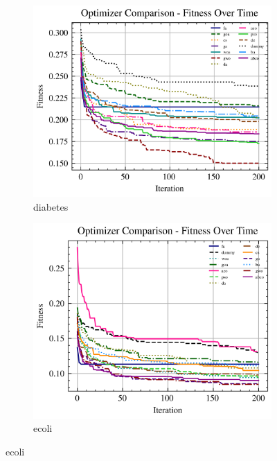 \begin{figure}[htp]
    \begin{subfigure}[b]{0.45\textwidth}
        \includegraphics[width=\textwidth]{imagenes/fitness_charts/img/binary/diabetes/optimizers_fitness_knn.png}
        \caption{diabetes}
        \label{fig:convergencia_diabetes_knn}
    \end{subfigure}
    \begin{subfigure}[b]{0.45\textwidth}
        \includegraphics[width=\textwidth]{imagenes/fitness_charts/img/binary/ecoli/optimizers_fitness_knn.png}
        \caption{ecoli}
        \label{fig:convergencia_ecoli_knn}
    \end{subfigure}


\end{figure}
